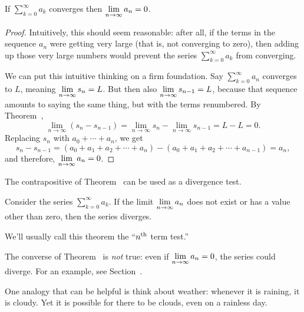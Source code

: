 \begin{theorem}\label{thm:divergence-test} If $\sum_{k=0}^\infty a_k$
  converges then $\displaystyle\lim_{n\to\infty}a_n=0$.
\end{theorem}
\begin{proof} Intuitively, this should seem reasonable: after all, if
  the terms in the sequence $a_n$ were getting very large (that is,
  not converging to zero), then adding up those very large numbers
  would prevent the series $\sum_{k=0}^\infty a_k$ from converging.

  We can put this intuitive thinking on a firm foundation.  Say
  $\sum_{k=0}^\infty a_n$ converges to $L$, meaning
  $\displaystyle\lim_{n\to\infty}s_n=L$.  But then also
  $\displaystyle\lim_{n\to\infty}s_{n-1}=L$, because that sequence amounts to
  saying the same thing, but with the terms renumbered.  By
  Theorem~,
$$
  \lim_{n\to\infty} (s_{n}-s_{n-1})=
  \lim_{n\to\infty} s_{n}-\lim_{n\to\infty}s_{n-1}=L-L=0.
$$
Replacing $s_n$ with $a_0+\cdots+a_n$, we get
$$
  s_{n}-s_{n-1}=(a_0+a_1+a_2+\cdots+a_n)-(a_0+a_1+a_2+\cdots+a_{n-1})
  =a_n,
$$
and therefore, $\displaystyle\lim_{n\to\infty}a_n=0$.
\end{proof}

The contrapositive of Theorem~ can be used
as a divergence test.
\begin{theorem}\label{thm:nth-term-test}
Consider the series $\sum_{k=0}^\infty
a_k$. If the limit $\displaystyle\lim_{n\to\infty}a_n$ does not exist or has a value
other than zero, then the series diverges.
\end{theorem}
We'll usually call this theorem the ``$n^{\mbox{\scriptsize th}}$ term test.''

\begin{warning}
  The converse of Theorem~ is {\em not\/}
  true: even if $\displaystyle\lim_{n\to\infty}a_n=0$, the series could diverge.
  For an example, see Section~.
\end{warning}
  One analogy that can be helpful is think
about weather: whenever it is raining, it is cloudy.  Yet it is
possible for there to be clouds, even on a rainless day.  

